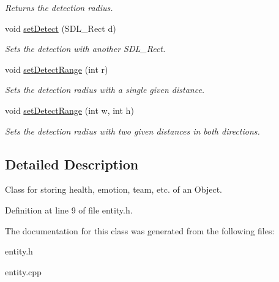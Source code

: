 \begin{DoxyCompactItemize}
\begin{DoxyCompactList}\small\item\em Returns the detection radius. \end{DoxyCompactList}\item 
void \hyperlink{classEntity_a7624a9b21bbb1bd97d7f2eac20339a82}{set\+Detect} (S\+D\+L\+\_\+\+Rect d)\hypertarget{classEntity_a7624a9b21bbb1bd97d7f2eac20339a82}{}\label{classEntity_a7624a9b21bbb1bd97d7f2eac20339a82}

\begin{DoxyCompactList}\small\item\em Sets the detection with another S\+D\+L\+\_\+\+Rect. \end{DoxyCompactList}\item 
void \hyperlink{classEntity_a884a7f8a537f3d0e926dfedb8e88a740}{set\+Detect\+Range} (int r)\hypertarget{classEntity_a884a7f8a537f3d0e926dfedb8e88a740}{}\label{classEntity_a884a7f8a537f3d0e926dfedb8e88a740}

\begin{DoxyCompactList}\small\item\em Sets the detection radius with a single given distance. \end{DoxyCompactList}\item 
void \hyperlink{classEntity_af4b91451301036e4aed029e90a7ba726}{set\+Detect\+Range} (int w, int h)\hypertarget{classEntity_af4b91451301036e4aed029e90a7ba726}{}\label{classEntity_af4b91451301036e4aed029e90a7ba726}

\begin{DoxyCompactList}\small\item\em Sets the detection radius with two given distances in both directions. \end{DoxyCompactList}\end{DoxyCompactItemize}


\subsection{Detailed Description}
Class for storing health, emotion, team, etc. of an Object. 

Definition at line 9 of file entity.\+h.



The documentation for this class was generated from the following files\+:\begin{DoxyCompactItemize}
\item 
entity.\+h\item 
entity.\+cpp\end{DoxyCompactItemize}
